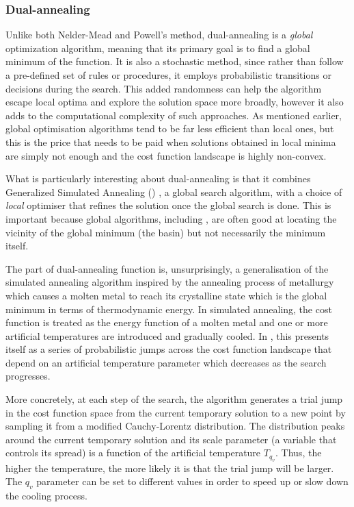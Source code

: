\subsubsection{Dual-annealing}\label{sec:3.1.3.3_dual_annealing}

Unlike both Nelder-Mead and Powell's method, dual-annealing is a \emph{global} optimization algorithm, meaning that its primary goal is to find a global minimum of the function. It is also a stochastic method, since rather than follow a pre-defined set of rules or procedures, it employs probabilistic transitions or decisions during the search. This added randomness can help the algorithm escape local optima and explore the solution space more broadly, however it also adds to the computational complexity of such approaches. As mentioned earlier, global optimisation algorithms tend to be far less efficient than local ones, but this is the price that needs to be paid when solutions obtained in local minima are simply not enough and the cost function landscape is highly non-convex. 

What is particularly interesting about dual-annealing is that it combines Generalized Simulated Annealing () \cite{tsallis_generalized_1996}, a global search algorithm, with a choice of \emph{local} optimiser that refines the solution once the global search is done. This is important because global algorithms, including , are often good at locating the vicinity of the global minimum (the basin) but not necessarily the minimum itself. 

The  part of dual-annealing function is, unsurprisingly, a generalisation of the simulated annealing algorithm \cite{kirkpatrick_optimization_1983} inspired by the annealing process of metallurgy which causes a molten metal to reach its crystalline state which is the global minimum in terms of thermodynamic energy. In simulated annealing, the cost function is treated as the energy function of a molten metal and one or more artificial temperatures are introduced and gradually cooled. In , this presents itself as a series of probabilistic jumps across the cost function landscape that depend on an artificial temperature parameter which decreases as the search progresses. 

More concretely, at each step of the search, the algorithm generates a trial jump in the cost function space from the current temporary solution to a new point by sampling it from a modified Cauchy-Lorentz distribution. The distribution peaks around the current temporary solution and its scale parameter (a variable that controls its spread) is a function of the artificial temperature $T_{q_v}$. Thus, the higher the temperature, the more likely it is that the trial jump will be larger. The $q_v$ parameter can be set to different values in order to speed up or slow down the cooling process.

